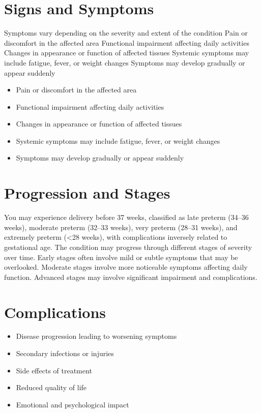 \section{Signs and Symptoms}
Symptoms vary depending on the severity and extent of the condition Pain or discomfort in the affected area Functional impairment affecting daily activities Changes in appearance or function of affected tissues Systemic symptoms may include fatigue, fever, or weight changes Symptoms may develop gradually or appear suddenly

\begin{itemize}[noitemsep]
  \item Pain or discomfort in the affected area
  \item Functional impairment affecting daily activities
  \item Changes in appearance or function of affected tissues
  \item Systemic symptoms may include fatigue, fever, or weight changes
  \item Symptoms may develop gradually or appear suddenly
\end{itemize}
\section{Progression and Stages}
You may experience delivery before 37 weeks, classified as late preterm (34--36 weeks), moderate preterm (32--33 weeks), very preterm (28--31 weeks), and extremely preterm (<28 weeks), with complications inversely related to gestational age. The condition may progress through different stages of severity over time. Early stages often involve mild or subtle symptoms that may be overlooked. Moderate stages involve more noticeable symptoms affecting daily function. Advanced stages may involve significant impairment and complications.
\section{Complications}
\begin{itemize}[noitemsep]
  \item Disease progression leading to worsening symptoms
  \item Secondary infections or injuries
  \item Side effects of treatment
  \item Reduced quality of life
  \item Emotional and psychological impact
\end{itemize}
